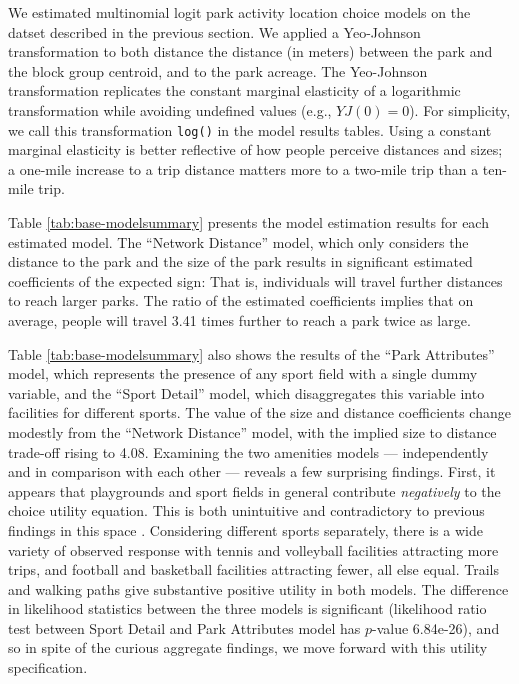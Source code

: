 \documentclass[3p, authoryear, review]{elsarticle} %
\begin{document}
We estimated multinomial logit park activity location choice models on the datset described in the previous section. We applied a Yeo-Johnson transformation \citep{Yeo2000} to both distance the distance (in meters) between the park and the block group centroid, and to the park acreage. The Yeo-Johnson transformation replicates the constant marginal elasticity of a logarithmic transformation while avoiding undefined values (e.g., \(YJ(0) = 0\)). For simplicity, we call this transformation \texttt{log()} in the model results tables. Using a constant marginal elasticity is better reflective of how people perceive distances and sizes; a one-mile increase to a trip distance matters more to a two-mile trip than a ten-mile trip.

Table \ref{tab:base-modelsummary} presents the model estimation results for each estimated model. The ``Network Distance'' model, which only considers the distance to the park and the size of the park results in significant estimated coefficients of the expected sign: That is, individuals will travel further distances to reach larger parks. The ratio of the estimated coefficients implies that on average, people will travel 3.41 times further to reach a park twice as large.

Table \ref{tab:base-modelsummary} also shows the results of the ``Park Attributes'' model, which represents the presence of any sport field with a single dummy variable, and the ``Sport Detail'' model, which disaggregates this variable into facilities for different sports. The value of the size and distance coefficients change modestly from the ``Network Distance'' model, with the implied size to distance trade-off rising to 4.08. Examining the two amenities models --- independently and in comparison with each other --- reveals a few surprising findings. First, it appears that playgrounds and sport fields in general contribute \emph{negatively} to the choice utility equation. This is both unintuitive and contradictory to previous findings in this space \citep[e.g.,][]{Kinnell2006}. Considering different sports separately, there is a wide variety of observed response with tennis and volleyball facilities attracting more trips, and football and basketball facilities attracting fewer, all else equal. Trails and walking paths give substantive positive utility in both models. The difference in likelihood statistics between the three models is significant (likelihood ratio test between Sport Detail and Park Attributes model has \(p\)-value 6.84e-26), and so in spite of the curious aggregate findings, we move forward with this utility specification.
\end{document}
